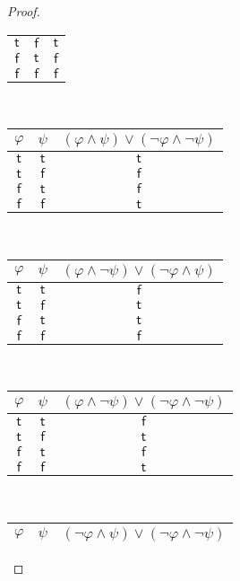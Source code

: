 \documentclass[12pt]{article}
\begin{document}
\begin{proof}
\begin{center}
\begin{tabular}{cc|c}
            $\mathsf{t}$ & $\mathsf{f}$ & $\mathsf{t}$ \\
            $\mathsf{f}$ & $\mathsf{t}$ & $\mathsf{f}$ \\
            $\mathsf{f}$ & $\mathsf{f}$ & $\mathsf{f}$ \\
        \end{tabular}
        ~~
        \begin{tabular}{cc|c}
            $\varphi$ & $\psi$ & $(\varphi \land \psi) \lor (\neg \varphi \land \neg \psi)$ \\ \hline
            $\mathsf{t}$ & $\mathsf{t}$ & $\mathsf{t}$ \\
            $\mathsf{t}$ & $\mathsf{f}$ & $\mathsf{f}$ \\
            $\mathsf{f}$ & $\mathsf{t}$ & $\mathsf{f}$ \\
            $\mathsf{f}$ & $\mathsf{f}$ & $\mathsf{t}$ \\
        \end{tabular}
        ~~
        \begin{tabular}{cc|c}
            $\varphi$ & $\psi$ & $(\varphi \land \neg \psi) \lor (\neg \varphi \land \psi)$ \\ \hline
            $\mathsf{t}$ & $\mathsf{t}$ & $\mathsf{f}$ \\
            $\mathsf{t}$ & $\mathsf{f}$ & $\mathsf{t}$ \\
            $\mathsf{f}$ & $\mathsf{t}$ & $\mathsf{t}$ \\
            $\mathsf{f}$ & $\mathsf{f}$ & $\mathsf{f}$ \\
        \end{tabular}
        ~~
        \begin{tabular}{cc|c}
            $\varphi$ & $\psi$ & $(\varphi \land \neg \psi) \lor (\neg \varphi \land \neg \psi)$ \\ \hline
            $\mathsf{t}$ & $\mathsf{t}$ & $\mathsf{f}$ \\
            $\mathsf{t}$ & $\mathsf{f}$ & $\mathsf{t}$ \\
            $\mathsf{f}$ & $\mathsf{t}$ & $\mathsf{f}$ \\
            $\mathsf{f}$ & $\mathsf{f}$ & $\mathsf{t}$ \\
        \end{tabular}
        ~~
        \begin{tabular}{cc|c}
            $\varphi$ & $\psi$ & $(\neg \varphi \land \psi) \lor (\neg \varphi \land \neg \psi)$ \\ \hline

\end{tabular}
\end{center}
\end{proof}
\end{document}
